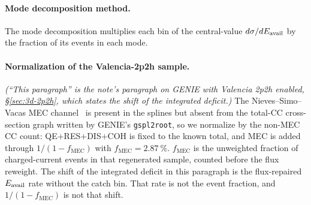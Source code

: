 \paragraph{Mode decomposition method.} The mode decomposition multiplies each bin of the central-value $d\sigma/dE_{\mathrm{avail}}$ by the fraction of its events in each mode.

\paragraph{Normalization of the Valencia-2p2h sample.} \noindent\emph{(``This paragraph'' is the note's paragraph on GENIE with Valencia 2p2h enabled, \S\ref{sec:3d-2p2h}, which states the shift of the integrated deficit.)} The Nieves--Simo--Vacas MEC channel~\cite{Nieves:2011pp,Gran:2013kda} is present in the splines but absent from the total-CC cross-section graph written by GENIE's \texttt{gspl2root}, so we normalize by the non-MEC CC count: QE$+$RES$+$DIS$+$COH is fixed to the known total, and MEC is added through $1/(1-f_{\mathrm{MEC}})$ with $f_{\mathrm{MEC}}=\SI{2.87}{\percent}$. $f_{\mathrm{MEC}}$ is the unweighted fraction of charged-current events in that regenerated sample, counted before the flux reweight. The shift of the integrated deficit in this paragraph is the flux-repaired $E_{\mathrm{avail}}$ rate without the catch bin. That rate is not the event fraction, and $1/(1-f_{\mathrm{MEC}})$ is not that shift.

